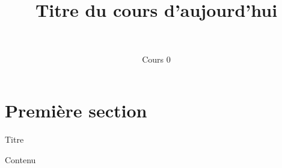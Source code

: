 \documentclass[xcolor=svgnames,t,aspectratio=169,handout]{uqtrcours}
\title[]{Titre du cours d'aujourd'hui}
\subtitle{\thecoursecode \ \textemdash \ \thecoursetitle}
\date[]{Cours 0}
\begin{document}
\begin{frame}
  \titlepage
  \thispagestyle{empty}
\end{frame}

\frame{\tableofcontents\thispagestyle{empty}}

\section{Première section}
\frame{\sectionpage}

\begin{frame}{Titre}

Contenu

\end{frame}
\end{document}
